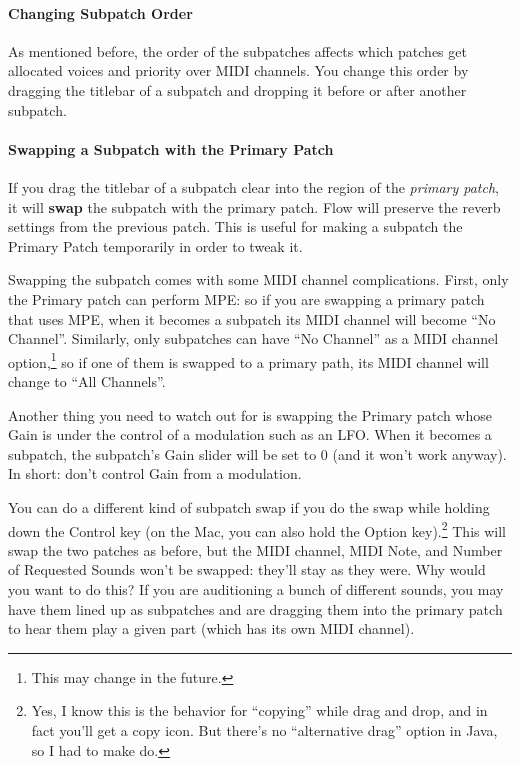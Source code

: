 \documentclass{article}
\begin{document}
\paragraph{Changing Subpatch Order}

As mentioned before, the order of the subpatches affects which patches get allocated voices and priority over MIDI channels.  You change this order by dragging the titlebar of a subpatch and dropping it before or after another subpatch.

\paragraph{Swapping a Subpatch with the Primary Patch}

If you drag the titlebar of a subpatch clear into the region of the {\it primary patch}, it will {\bf swap} the subpatch with the primary patch.  Flow will preserve the reverb settings from the previous patch.  This is useful for making a subpatch the Primary Patch temporarily in order to tweak it.

Swapping the subpatch comes with some MIDI channel complications.  First, only the Primary patch can perform MPE: so if you are swapping a primary patch that uses MPE, when it becomes a subpatch its MIDI channel will become ``No Channel''.  Similarly, only subpatches can have ``No Channel'' as a MIDI channel option,\footnote{This may change in the future.} so if one of them is swapped to a primary path, its MIDI channel will change to ``All Channels''.

Another thing you need to watch out for is swapping the Primary patch whose Gain is under the control of a modulation such as an LFO.  When it becomes a subpatch, the subpatch's Gain slider will be set to 0 (and it won't work anyway).  In short: don't control Gain from a modulation.

You can do a different kind of subpatch swap if you do the swap while holding down the Control key (on the Mac, you can also hold the Option key).\footnote{Yes, I know this is the behavior for ``copying'' while drag and drop, and in fact you'll get a copy icon.  But there's no ``alternative drag'' option in Java, so I had to make do.}  This will swap the two patches as before, but the MIDI channel, MIDI Note, and Number of Requested Sounds won't be swapped: they'll stay as they were.  Why would you want to do this?  If you are auditioning a bunch of different sounds, you may have them lined up as subpatches and are dragging them into the primary patch to hear them play a given part (which has its own MIDI channel).
\end{document}
